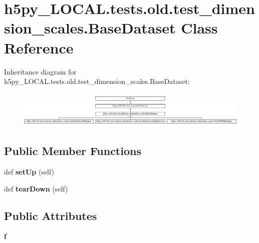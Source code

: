 \hypertarget{classh5py__LOCAL_1_1tests_1_1old_1_1test__dimension__scales_1_1BaseDataset}{}\section{h5py\+\_\+\+L\+O\+C\+A\+L.\+tests.\+old.\+test\+\_\+dimension\+\_\+scales.\+Base\+Dataset Class Reference}
\label{classh5py__LOCAL_1_1tests_1_1old_1_1test__dimension__scales_1_1BaseDataset}
Inheritance diagram for h5py\+\_\+\+L\+O\+C\+A\+L.\+tests.\+old.\+test\+\_\+dimension\+\_\+scales.\+Base\+Dataset\+:\begin{figure}[H]
\begin{center}
\leavevmode
\includegraphics[height=1.761006cm]{classh5py__LOCAL_1_1tests_1_1old_1_1test__dimension__scales_1_1BaseDataset}
\end{center}
\end{figure}
\subsection*{Public Member Functions}
\begin{DoxyCompactItemize}
\item 
\mbox{\label{classh5py__LOCAL_1_1tests_1_1old_1_1test__dimension__scales_1_1BaseDataset_a6f6c183da61690ec0a38c3a5a02a5037}} 
def {\bfseries set\+Up} (self)
\item 
\mbox{\label{classh5py__LOCAL_1_1tests_1_1old_1_1test__dimension__scales_1_1BaseDataset_afbbcee9c52bdaed229656fad5dbc8a99}} 
def {\bfseries tear\+Down} (self)
\end{DoxyCompactItemize}
\subsection*{Public Attributes}
\begin{DoxyCompactItemize}
\item 
\mbox{\label{classh5py__LOCAL_1_1tests_1_1old_1_1test__dimension__scales_1_1BaseDataset_a57f7e0f72e221c6b3fea90b3842c2a2e}} 
{\bfseries f}
\end{DoxyCompactItemize}


